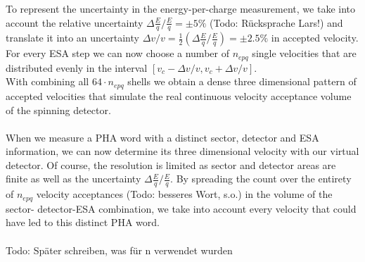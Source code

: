 To represent the uncertainty in the energy-per-charge measurement, we take into account the relative uncertainty $\Delta \frac{E}{q}/\frac{E}{q} = \pm 5\%$ (Todo: Rücksprache Lars!) and translate it into an uncertainty $\Delta v / v = \frac{1}{2} \left( \Delta \frac{E}{q}/\frac{E}{q}\right) = \pm 2.5\%$ in accepted velocity. For every ESA step we can now choose a number of $n_{epq}$ single velocities that are distributed evenly in the interval $\left[ v_c - \Delta v / v, v_c + \Delta v / v \right]$. %
\\
With combining all $64 \cdot n_{epq}$ shells we obtain a dense three dimensional pattern of accepted velocities that simulate the real continuous velocity acceptance volume of the spinning detector.
\\ \\
When we measure a PHA word with a distinct sector, detector and ESA information, we can now determine its three dimensional velocity with our virtual detector. Of course, the resolution is limited as sector and detector areas are finite as well as the uncertainty $\Delta \frac{E}{q}/\frac{E}{q}$. By spreading the count over the entirety of $n_{epq}$ velocity acceptances (Todo: besseres Wort, s.o.) in the volume of the sector- detector-ESA combination, we take into account every velocity that could have led to this distinct PHA word.
\\ \\
Todo: Später schreiben, was für n verwendet wurden
%
%
%
